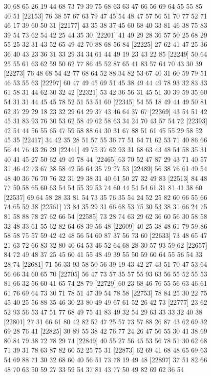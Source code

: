 \documentclass{article}
\begin{document}
\begin{figure}[H]
\begin{Schunk}
\begin{Soutput}
[22129] 30 68 65 26 19 44 68 73 79 39 75 68 63 63 47 66 56 69 64 55 55 85 40 51
[22153] 76 38 57 67 63 79 47 45 54 48 47 57 56 51 70 77 52 71 46 17 39 60 50 31
[22177] 43 35 38 37 45 60 68 40 33 81 46 38 75 83 39 54 73 62 54 42 25 44 35 30
[22201] 41 49 29 28 36 57 50 25 68 29 55 25 32 31 43 52 65 49 42 70 88 68 56 84
[22225] 27 62 41 47 25 36 36 40 43 23 36 31 33 29 34 34 61 44 49 19 23 43 22 85
[22249] 50 64 25 55 61 63 62 59 50 62 77 86 45 52 87 65 41 83 57 64 70 43 30 39
[22273] 76 48 68 54 42 77 68 64 52 88 34 82 53 67 40 31 60 59 79 51 46 53 55 63
[22297] 60 47 49 45 69 51 45 38 49 44 49 78 93 32 83 33 61 58 31 44 62 30 32 42
[22321] 53 42 36 56 31 45 51 30 39 59 35 60 54 31 31 44 45 45 78 52 51 53 51 60
[22345] 54 55 18 49 44 49 50 81 62 37 29 29 18 23 32 29 64 29 37 43 46 64 37 67
[22369] 43 54 51 42 45 31 83 93 76 30 53 62 58 49 62 58 63 34 24 70 43 57 54 72
[22393] 42 54 44 56 55 65 47 59 58 88 64 30 31 67 88 51 61 45 55 29 58 52 45 35
[22417] 34 42 35 28 51 57 55 36 77 51 64 71 62 53 71 40 86 66 56 44 76 43 26 29
[22441] 49 75 37 62 93 31 68 63 43 48 54 58 35 31 40 41 45 27 50 62 49 49 78 44
[22465] 63 70 52 47 87 29 43 71 40 57 31 46 42 73 67 38 58 42 56 64 35 79 27 53
[22489] 56 38 76 61 40 54 48 40 36 76 70 76 32 31 29 38 31 40 61 50 27 32 49 83
[22513] 84 48 77 50 58 65 60 63 54 54 55 39 53 74 60 44 54 54 61 31 81 41 38 60
[22537] 69 64 58 28 33 81 54 73 35 76 35 54 24 52 25 82 60 66 55 66 74 65 59 38
[22561] 73 84 35 29 31 66 68 53 75 30 53 38 31 66 24 75 81 58 88 78 27 62 66 54
[22585] 73 28 74 63 29 62 36 60 56 30 58 58 32 48 33 61 55 62 82 64 68 39 56 48
[22609] 40 25 38 48 61 79 59 86 58 58 75 57 59 42 42 48 56 54 60 87 37 56 73 60
[22633] 73 48 65 47 21 63 72 66 83 32 80 40 64 53 46 52 64 68 28 30 57 93 59 62
[22657] 84 72 49 48 37 25 45 60 41 55 48 49 39 55 50 59 60 64 55 56 54 33 28 74
[22681] 71 56 33 93 58 50 56 39 19 43 42 27 43 51 70 47 53 64 56 66 34 60 65 70
[22705] 56 47 73 57 35 57 55 93 63 56 55 52 55 53 81 66 32 56 60 41 65 74 28 79
[22729] 60 23 68 46 76 55 56 63 46 61 61 76 69 64 73 30 71 78 51 47 39 54 78 58
[22753] 78 84 25 30 22 75 45 40 25 56 88 35 46 30 23 80 49 49 67 61 52 26 42 73
[22777] 23 62 52 93 56 53 47 51 77 68 49 75 41 83 49 32 54 29 63 33 33 32 40 38
[22801] 27 31 66 61 80 42 82 52 47 25 57 73 57 88 26 87 43 62 69 32 69 28 76 41
[22825] 30 89 55 38 42 76 77 24 26 47 56 55 30 41 38 69 80 84 79 38 72 78 29 74
[22849] 40 55 27 56 45 53 56 78 51 30 62 68 71 39 31 78 63 87 82 60 52 25 75 31
[22873] 62 69 41 68 48 65 69 63 54 69 88 71 30 32 68 60 40 56 51 73 78 19 49 48
[22897] 37 51 82 66 48 70 63 50 59 27 33 59 54 37 81 43 77 50 49 82 69 62 36 54

\end{Soutput}
\end{Schunk}
\end{figure}
\end{document}
